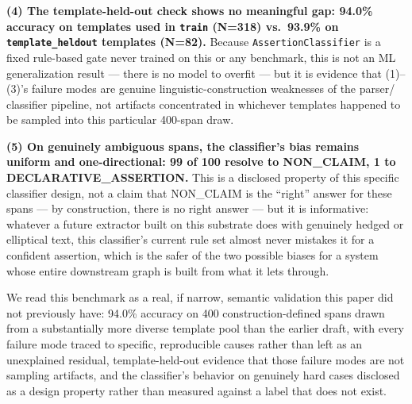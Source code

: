 \textbf{(4) The template-held-out check shows no meaningful gap: 94.0\%
accuracy on templates used in \texttt{train} (N=318) vs.\ 93.9\% on
\texttt{template\_heldout} templates (N=82).} Because
\texttt{AssertionClassifier} is a fixed rule-based gate never trained on
this or any benchmark, this is not an ML generalization result --- there
is no model to overfit --- but it is evidence that (1)--(3)'s failure
modes are genuine linguistic-construction weaknesses of the parser/
classifier pipeline, not artifacts concentrated in whichever templates
happened to be sampled into this particular 400-span draw.

\textbf{(5) On genuinely ambiguous spans, the classifier's bias remains
uniform and one-directional: 99 of 100 resolve to NON\_CLAIM, 1 to
DECLARATIVE\_ASSERTION.} This is a disclosed property of this specific
classifier design, not a claim that NON\_CLAIM is the ``right'' answer
for these spans --- by construction, there is no right answer --- but it
is informative: whatever a future extractor built on this substrate
does with genuinely hedged or elliptical text, this classifier's current
rule set almost never mistakes it for a confident assertion, which is
the safer of the two possible biases for a system whose entire
downstream graph is built from what it lets through.

We read this benchmark as a real, if narrow, semantic validation this
paper did not previously have: 94.0\% accuracy on 400 construction-defined
spans drawn from a substantially more diverse template pool than the
earlier draft, with every failure mode traced to specific, reproducible
causes rather than left as an unexplained residual, template-held-out
evidence that those failure modes are not sampling artifacts, and the
classifier's behavior on genuinely hard cases disclosed as a design
property rather than measured against a label that does not exist.
